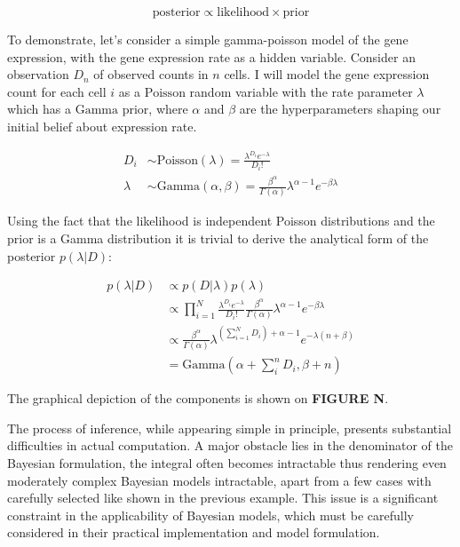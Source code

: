 \begin{equation}
\text{posterior} \propto \text{likelihood} \times \text{prior}
\end{equation}

To demonstrate, let’s consider a simple gamma-poisson model of the gene expression, with the gene expression rate as a hidden variable. Consider an observation $D_n$  of observed counts in $n$ cells. I will model the gene expression count for each cell $i$ as a $\text{Poisson}$ random variable with the rate parameter $\lambda$ which has a $\text{Gamma}$ prior, where $\alpha$ and $\beta$ are the hyperparameters shaping our initial belief about expression rate.

\begin{align}
    D_i & \sim \text{Poisson}(\lambda) = \frac{\lambda^{D_i} e^{-\lambda}}{D_i!} \\
    \lambda & \sim \text{Gamma}(\alpha, \beta) = \frac{\beta^\alpha}{\Gamma(\alpha)} \lambda^{\alpha - 1} e^{-\beta \lambda}
\end{align}
    
Using the fact that the likelihood is independent Poisson distributions and the prior is a Gamma distribution it is trivial to derive the analytical form of the posterior $p(\lambda|D)$:

\begin{align}
        p(\lambda|D) & \propto p(D|\lambda) p(\lambda) \\
         & \propto \prod_{i=1}^N \frac{\lambda^{D_i} e^{-\lambda}}{D_i!} \frac{\beta^\alpha}{\Gamma(\alpha)} \lambda^{\alpha - 1} e^{-\beta \lambda} \\ 
        & \propto  \frac{\beta^\alpha}{\Gamma(\alpha)} \lambda^{\left(\sum_{i=1}^N D_i\right) + \alpha - 1} e^{-\lambda(n+\beta)} \\
         & = \text{Gamma}(\alpha + \sum_i^n D_i, \beta + n)
\end{align}

The graphical depiction of the components is shown on \textbf{FIGURE N}.


The process of inference, while appearing simple in principle, presents substantial difficulties in actual computation. A major obstacle lies in the denominator of the Bayesian formulation, the integral often becomes intractable  thus rendering even moderately complex Bayesian models intractable, apart from a few cases with carefully selected  like shown in the previous example. This issue is a significant constraint in the applicability of Bayesian models, which must be carefully considered in their practical implementation and model formulation.

